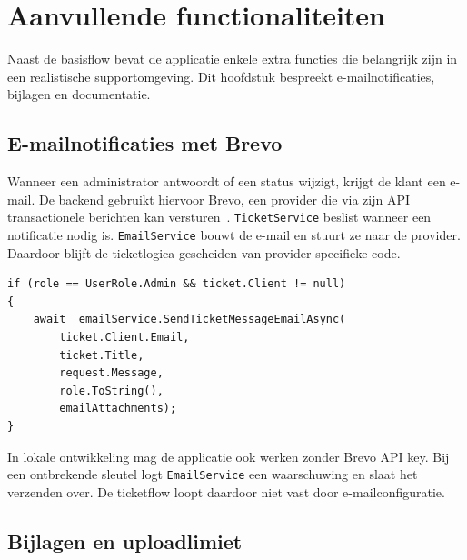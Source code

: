 
\chapter{Aanvullende functionaliteiten}%
\label{ch:aanvullende-functionaliteiten}

Naast de basisflow bevat de applicatie enkele extra functies die belangrijk zijn in een realistische supportomgeving. Dit hoofdstuk bespreekt e-mailnotificaties, bijlagen en documentatie.

\section{E-mailnotificaties met Brevo}

Wanneer een administrator antwoordt of een status wijzigt, krijgt de klant een e-mail. De backend gebruikt hiervoor Brevo, een provider die via zijn API transactionele berichten kan versturen~\autocite{BrevoApiDocs2026}. \texttt{TicketService} beslist wanneer een notificatie nodig is. \texttt{EmailService} bouwt de e-mail en stuurt ze naar de provider. Daardoor blijft de ticketlogica gescheiden van provider-specifieke code.

\begin{listing}[htbp]
\begin{verbatim}
if (role == UserRole.Admin && ticket.Client != null)
{
    await _emailService.SendTicketMessageEmailAsync(
        ticket.Client.Email,
        ticket.Title,
        request.Message,
        role.ToString(),
        emailAttachments);
}
\end{verbatim}
\caption[E-mail bij adminantwoord]{Een adminantwoord triggert een e-mail naar de klant.}
\label{lst:admin-email}
\end{listing}

In lokale ontwikkeling mag de applicatie ook werken zonder Brevo API key. Bij een ontbrekende sleutel logt \texttt{EmailService} een waarschuwing en slaat het verzenden over. De ticketflow loopt daardoor niet vast door e-mailconfiguratie.

\clearpage

\section{Bijlagen en uploadlimiet}

